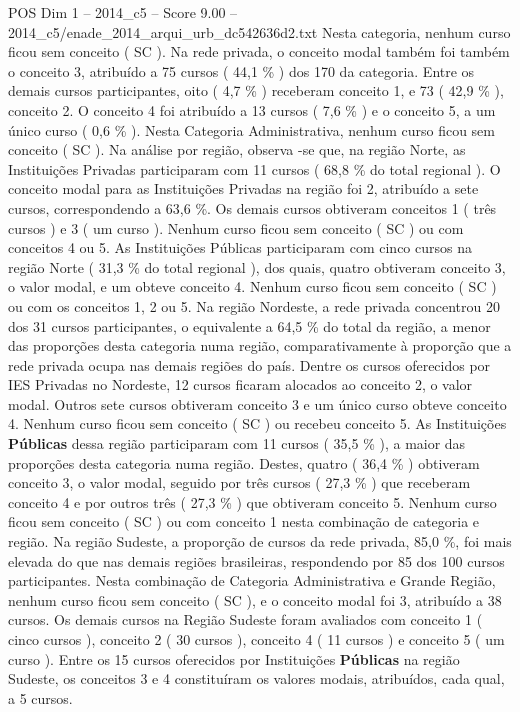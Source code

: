 \begin{textsample}{POS Dim 1 – 2014\_c5 – Score 9.00 – 2014\_c5/enade\_2014\_arqui\_urb\_dc542636d2.txt}
Nesta categoria, nenhum curso ficou sem conceito ( SC ).
Na rede privada, o conceito modal também foi também o conceito 3, atribuído a 75 cursos ( 44,1 \% ) dos 170 da categoria.
Entre os demais cursos participantes, oito ( 4,7 \% ) receberam conceito 1, e 73 ( 42,9 \% ), conceito 2.
O conceito 4 foi atribuído a 13 cursos ( 7,6 \% ) e o conceito 5, a um único curso ( 0,6 \% ).
Nesta Categoria Administrativa, nenhum curso ficou sem conceito ( SC ).
Na análise por região, observa -se que, na região Norte, as Instituições Privadas participaram com 11 cursos ( 68,8 \% do total regional ).
O conceito modal para as Instituições Privadas na região foi 2, atribuído a sete cursos, correspondendo a 63,6 \%.
Os demais cursos obtiveram conceitos 1 ( três cursos ) e 3 ( um curso ).
Nenhum curso ficou sem conceito ( SC ) ou com conceitos 4 ou 5.
As Instituições Públicas participaram com cinco cursos na região Norte ( 31,3 \% do total regional ), dos quais, quatro obtiveram conceito 3, o valor modal, e um obteve conceito 4.
Nenhum curso ficou sem conceito ( SC ) ou com os conceitos 1, 2 ou 5.
Na região Nordeste, a rede privada concentrou 20 dos 31 cursos participantes, o equivalente a 64,5 \% do total da região, a menor das proporções desta categoria numa região, comparativamente à proporção que a rede privada ocupa nas demais regiões do país.
Dentre os cursos oferecidos por IES Privadas no Nordeste, 12 cursos ficaram alocados ao conceito 2, o valor modal.
Outros sete cursos obtiveram conceito 3 e um único curso obteve conceito 4.
Nenhum curso ficou sem conceito ( SC ) ou recebeu conceito 5.
As Instituições \textbf{Públicas} dessa região participaram com 11 cursos ( 35,5 \% ), a maior das proporções desta categoria numa região.
Destes, quatro ( 36,4 \% ) obtiveram conceito 3, o valor modal, seguido por três cursos ( 27,3 \% ) que receberam conceito 4 e por outros três ( 27,3 \% ) que obtiveram conceito 5.
Nenhum curso ficou sem conceito ( SC ) ou com conceito 1 nesta combinação de categoria e região.
Na região Sudeste, a proporção de cursos da rede privada, 85,0 \%, foi mais elevada do que nas demais regiões brasileiras, respondendo por 85 dos 100 cursos participantes.
Nesta combinação de Categoria Administrativa e Grande Região, nenhum curso ficou sem conceito ( SC ), e o conceito modal foi 3, atribuído a 38 cursos.
Os demais cursos na Região Sudeste foram avaliados com conceito 1 ( cinco cursos ), conceito 2 ( 30 cursos ), conceito 4 ( 11 cursos ) e conceito 5 ( um curso ).
Entre os 15 cursos oferecidos por Instituições \textbf{Públicas} na região Sudeste, os conceitos 3 e 4 constituíram os valores modais, atribuídos, cada qual, a 5 cursos.

\end{textsample}
